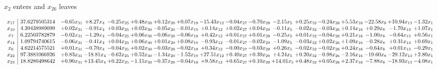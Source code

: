 \documentclass[9pt]{article}
\begin{document}
 $ x_{2} $ enters and $ x_{26} $ leaves 

 \[\begin{array}{c| c c@{\hskip 2pt} c@{\hskip 2pt} c@{\hskip 2pt} c@{\hskip 2pt} c@{\hskip 2pt} c@{\hskip 2pt} c@{\hskip 2pt} c@{\hskip 2pt} c@{\hskip 2pt} c@{\hskip 2pt} c@{\hskip 2pt} c@{\hskip 2pt} c@{\hskip 2pt} c@{\hskip 2pt} c@{\hskip 2pt} c@{\hskip 2pt} }
 x_{17}   &  37.6279505314 & -0.65 x_{31} & +  8.27 x_{4} & -0.25 x_{25} & +  0.48 x_{30} & +  0.12 x_{20} & +  0.07 x_{19} & -15.43 x_{12} & -0.04 x_{27} & -0.70 x_{29} & -2.15 x_{5} & +  0.25 x_{32} & -0.24 x_{26} & +  5.53 x_{16} & -22.58 x_{8} & + 10.94 x_{13} & -1.32 x_{1}\\
 x_{10}   &  4.39438989099 & +  0.02 x_{31} & -0.91 x_{4} & +  0.03 x_{25} & +  0.02 x_{30} & -0.05 x_{20} & -0.01 x_{19} & +  0.14 x_{12} & +  0.02 x_{27} & +  0.04 x_{29} & -0.11 x_{5} & -0.02 x_{32} & -0.03 x_{26} & +  0.14 x_{16} & +  0.29 x_{8} & -1.70 x_{13} & +  1.07 x_{1}\\
 x_{7}   &  6.22503782879 & -0.02 x_{31} & -1.29 x_{4} & -0.04 x_{25} & +  0.06 x_{30} & -0.06 x_{20} & -0.06 x_{19} & +  0.42 x_{12} & +  0.01 x_{27} & +  0.01 x_{29} & -0.25 x_{5} & +  0.01 x_{32} & -0.04 x_{26} & +  0.21 x_{16} & -1.00 x_{8} & -0.64 x_{13} & +  0.56 x_{1}\\
 x_{14}   &  1.09794740615 & -0.06 x_{31} & -0.41 x_{4} & +  0.04 x_{25} & +  0.06 x_{30} & +  0.01 x_{20} & +  0.08 x_{19} & -0.93 x_{12} & -0.01 x_{27} & -0.02 x_{29} & -1.09 x_{5} & -0.03 x_{32} & +  0.02 x_{26} & +  1.09 x_{16} & -0.28 x_{8} & +  0.31 x_{13} & +  0.69 x_{1}\\
 x_{6}   &  4.62214575521 & +  0.01 x_{31} & -0.70 x_{4} & -0.04 x_{25} & +  0.02 x_{30} & -0.03 x_{20} & -0.02 x_{19} & +  0.34 x_{12} & -0.00 x_{27} & -0.03 x_{29} & +  0.26 x_{5} & -0.02 x_{32} & -0.02 x_{26} & +  0.24 x_{16} & -0.64 x_{8} & +  0.01 x_{13} & -0.29 x_{1}\\
 x_{22}   &  97.3881066926 & +  0.83 x_{31} & -18.81 x_{4} & -0.62 x_{25} & +  0.52 x_{30} & -1.34 x_{20} & -1.52 x_{19} & + 27.51 x_{12} & +  0.40 x_{27} & +  0.39 x_{29} & +  4.24 x_{5} & +  0.20 x_{32} & -0.98 x_{26} & -2.16 x_{16} & -19.60 x_{8} & -29.12 x_{13} & +  2.80 x_{1}\\
 x_{23}   &  18.8280498642 & +  0.90 x_{31} & + 13.45 x_{4} & +  0.22 x_{25} & -1.15 x_{30} & -0.37 x_{20} & -0.04 x_{19} & +  9.58 x_{12} & +  0.65 x_{27} & +  0.10 x_{29} & + 14.01 x_{5} & +  0.48 x_{32} & +  0.05 x_{26} & +  2.37 x_{16} & -7.88 x_{8} & -18.93 x_{13} & -4.08 x_{1}\\

\end{array}\]
\end{document}
